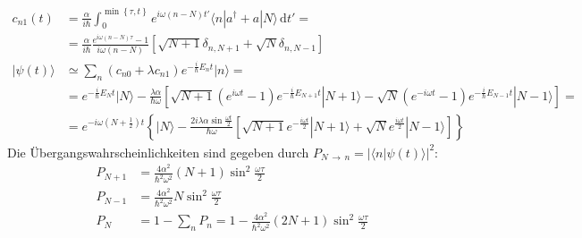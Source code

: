 \documentclass[a4paper,12pt]{article}
\newcommand{\brak}{}
\newcommand{\braket}{}
\newcommand{\intx}{}
\newcommand{\kla}{}
\newcommand{\klam}{}
\newcommand{\klammer}{}
\newcommand{\Ket}{}
\begin{document}
\begin{align*}
c_{n1}(t)&=\frac{\alpha}{i\hbar}\intx\int_{0}^{\min\klammer\left\{{\tau,t} \right\}}e^{i\omega (n-N)t'}\braket\langle {n} | {a^\dagger +a} | {N}\rangle\,\mathrm{d}t'=\\
&=\frac{\alpha}{i\hbar}\frac{e^{i\omega (n-N)\tau}-1}{i\omega(n-N)}\klam\left[ {\sqrt{N+1}\delta_{n,N+1}+\sqrt{N}\delta_{n,N-1}} \right]\\
\Ket | {\psi(t)} \rangle&\simeq \sum_n(c_{n0}+\lambda c_{n1})e^{-\frac{i}{\hbar}E_nt}\Ket | {n} \rangle=\\
&=e^{-\frac{i}{\hbar}E_Nt}\Ket | {N} \rangle-\frac{\lambda\alpha}{\hbar\omega}\klam\left[ {\sqrt{N+1}\kla\left( {e^{i\omega t}-1} \right) e^{-\frac{i}{\hbar}E_{N+1}t}\Ket | {N+1} \rangle-\sqrt{N}\kla\left( {e^{-i\omega t}-1} \right)e^{-\frac{i}{\hbar}E_{N-1}t}\Ket | {N-1} \rangle} \right]=\\
&=e^{-i\omega\kla\left( {N+\frac{1}{2}} \right)t}\klammer\left\{{\Ket | {N} \rangle-\frac{2i\lambda\alpha\sin\frac{\omega t}{2}}{\hbar\omega}\klam\left[ {\sqrt{N+1}e^{-\frac{i\omega t}{2}}\Ket | {N+1} \rangle+\sqrt{N}e^{\frac{i\omega t}{2}}\Ket | {N-1} \rangle} \right]} \right\}
\end{align*}
Die Übergangswahrscheinlichkeiten sind gegeben durch $P_{N\,\rightarrow\, n}=|\brak\langle {n}| {\psi(t)}\rangle|^2$:
\begin{align*}
P_{N+1}&=\frac{4\alpha^2}{\hbar^2\omega^2}(N+1)\sin^2\frac{\omega\tau}{2}\\
P_{N-1}&=\frac{4\alpha^2}{\hbar^2\omega^2}N\sin^2\frac{\omega\tau}{2}\\
P_N&=1-\sum_nP_n=1-\frac{4\alpha^2}{\hbar^2\omega^2}(2N+1)\sin^2\frac{\omega\tau}{2}
\end{align*}
\end{document}
